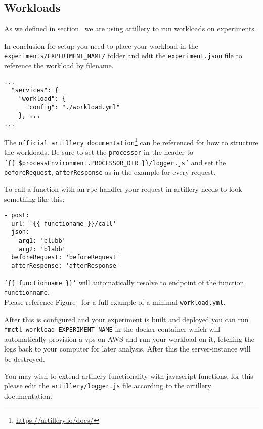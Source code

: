 \documentclass[../main.tex]{subfiles}
\begin{document}
\subsection{Workloads}\label{sec:WorkloadsUsage}

As we defined in section~ we are using artillery to run workloads on experiments. 

In conclusion for setup you need to place your workload in the \\
\texttt{experiments/EXPERIMENT\_NAME/} 
folder and edit the \texttt{experiment.json} file to reference the workload by filename.

\begin{tcolorbox}[titleDetachedStyle, title=\texttt{experiment.json}]
\begin{verbatim}
...
  "services": {
    "workload": {
      "config": "./workload.yml"
    }, ...
...
\end{verbatim}
\end{tcolorbox}

The \texttt{official artillery documentation}\footnote{\url{https://artillery.io/docs/}} can be referenced for how to structure the workloads. Be sure to set the \texttt{processor} in the header to \\\texttt{'\{\{ \$processEnvironment.PROCESSOR\_DIR \}\}/logger.js'} and set the \texttt{beforeRequest}, \texttt{afterResponse} as in the example  for every request. 



To call a function with an rpc handler your request in artillery needs to look something like this:

\begin{tcolorbox}[titleDetachedStyle, title=\texttt{workload.yml}]
\begin{verbatim}
- post:
  url: '{{ functioname }}/call'
  json:
    arg1: 'blubb' 
    arg2: 'blabb'
  beforeRequest: 'beforeRequest'
  afterResponse: 'afterResponse'
\end{verbatim}
\end{tcolorbox}

\texttt{'\{\{ functionname \}\}'} will automatically resolve to endpoint of the function \texttt{functionname}. \\
Please reference Figure~ for a full example of a minimal \texttt{workload.yml}.

After this is configured and your experiment is built and deployed you can run \texttt{fmctl workload EXPERIMENT\_NAME} in the docker container which will automatically provision a vps on AWS and run your workload on it, fetching the logs back to your computer for later analysis. After this the server-instance will be destroyed.

You may wish to extend artillery functionality with javascript functions, for this please edit the \texttt{artillery/logger.js} file according to the artillery documentation.
\end{document}
